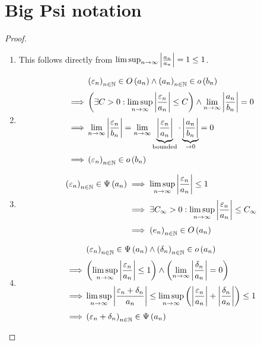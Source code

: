 \section{Big Psi notation}



\begin{proof} ~
  \begin{enumerate}
    \item

      This follows directly from $\limsup_{n\to\infty} \left|{\frac{a_n}{a_n}}\right| = 1 \le 1$.

    \item \label{proof:littleo_rule}

      \begin{align}
        & \seq{\epsilon_n}\in\bigo{a_n} \land \seq{a_n} \in \littleo{b_n} \nl
        \implies & \left(\exists C > 0: \limsup_{n\to\infty} \abs{\frac{\epsilon_n}{a_n}} \le C\right) \land \lim_{n\to\infty} \abs{\frac{a_n}{b_n}} = 0 \nl
        \implies & \lim_{n\to\infty} \abs{\frac{\epsilon_n}{b_n}} = \lim_{n\to\infty} \underbrace{\abs{\frac{\epsilon_n}{a_n}}}_{\text{bounded}} \cdot \underbrace{\abs{\frac{a_n}{b_n}}}_{\to 0} = 0 \nl
        \implies & \seq{\epsilon_n} \in \littleo{b_n}
      \end{align}

    \item

      \begin{align}
        \seq{\epsilon_n} \in \bigpsi{a_n} & \implies \limsup_{n\to\infty} \abs{\frac{\epsilon_n}{a_n}} \le 1 \nl
                                          & \implies \exists C_\infty > 0 : \limsup_{n\to\infty} \abs{\frac{\epsilon_n}{a_n}} \le C_\infty \nl
                                          & \implies \seq{e_n} \in \bigo{a_n}
      \end{align}

    \item

      \begin{align}
        & \seq{\epsilon_n} \in \bigpsi{a_n} \land \seq{\delta_n} \in \littleo{a_n} \nl
        \implies& \left(\limsup_{n\to\infty} \abs{\frac{\epsilon_n}{a_n}} \le 1\right) \land \left(\lim_{n\to\infty} \abs{\frac{\delta_n}{a_n}} = 0\right) \nl
        \implies& \limsup_{n\to\infty} \abs{\frac{\epsilon_n+\delta_n}{a_n}} \le \limsup_{n\to\infty} \left(\abs{\frac{\epsilon_n}{a_n}}+\abs{\frac{\delta_n}{a_n}}\right) \le 1 \nl
        \implies& \seq{\epsilon_n+\delta_n} \in \bigpsi{a_n}
      \end{align}


\end{enumerate}
\end{proof}

